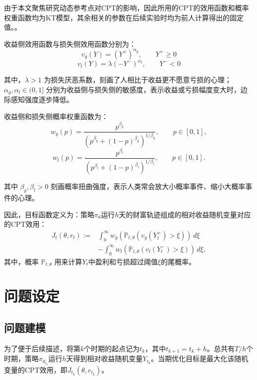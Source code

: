 \documentclass{sufethesismas}
\begin{document}
由于本文聚焦研究动态参考点对CPT的影响，因此所用的CPT的效用函数和概率权重函数均为KT模型，其余相关的参数在后续实验时均为前人计算得出的固定值。\citep{kahneman1979prospect}。

收益侧效用函数与损失侧效用函数分别为：
\begin{equation}
v_g(Y)
=(Y^+)^{\alpha_g},
\qquad
Y^+\ge 0
\end{equation}
\begin{equation}
v_l(Y)
=\lambda (-Y^-)^{\alpha_l},  
\qquad
Y^-<0
\end{equation}

其中，$\lambda>1$ 为损失厌恶系数，刻画了人相比于收益更不愿意亏损的心理；$\alpha_g,\alpha_l\in(0,1]$ 分别为收益侧与损失侧的敏感度，表示收益或亏损幅度变大时，边际感知强度逐步降低。

收益侧和损失侧概率权重函数为：
\begin{equation}
 w_g(p)=\frac{p^{\beta_g}}{\left(p^{\beta_g}+(1-p)^{\beta_g}\right)^{1/\beta_g}},\qquad p\in[0,1],
\end{equation}
\begin{equation}
 w_l(p)=\frac{p^{\beta_l}}{\left(p^{\beta_l}+(1-p)^{\beta_l}\right)^{1/\beta_l}},\qquad p\in[0,1].
\end{equation}

其中 $\beta_g,\beta_l>0$ 刻画概率扭曲强度，表示人类常会放大小概率事件、缩小大概率事件的心理。

因此，目标函数定义为：策略$\pi_{\theta}$运行$h$天的财富轨迹组成的相对收益随机变量对应的CPT效用：
\begin{equation}
\label{eq:cpt_objective_ch7}
\begin{aligned}
J_t(\theta,r_t)
:=&\int_0^\infty w_g\!\left(\mathbb{P}_{t,\theta}\left(v_g(Y_t^+)>\xi\right)\right)\,d\xi \\
&-\int_0^\infty  w_l\!\left(\mathbb{P}_{t,\theta}\left(v_l(Y_t^-)>\xi\right)\right)\,d\xi,
\end{aligned}
\end{equation}
其中，概率 $\mathbb{P}_{t,\theta}$ 用来计算$Y_t$中盈利和亏损超过阈值$\xi$的尾概率。
\section{问题设定}
\subsection{问题建模}
为了便于后续描述，将第$k$个时期的起点记为$t_k$，其中$t_{k+1}=t_k+h$。总共有$T/h$个时期，策略$\pi_{\theta_{t_k}}$运行$h$天得到相对收益随机变量$Y_{t_k}$。当期优化目标是最大化该随机变量的CPT效用，即$J_{t_k}(\theta,r_{t_k})$。
\end{document}

